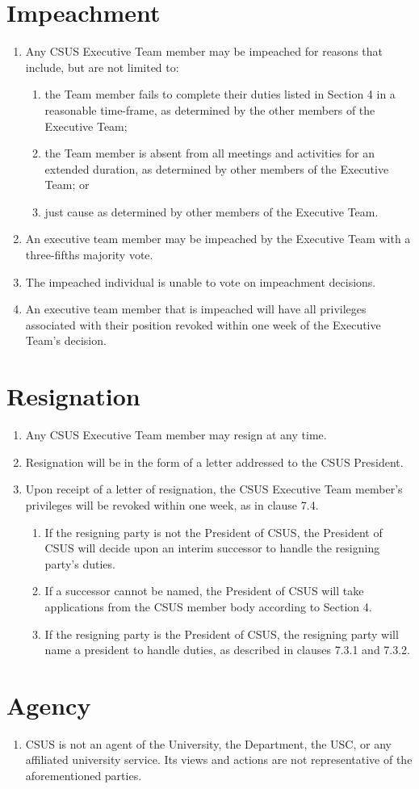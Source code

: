 \documentclass{article}
\begin{document}
\section{Impeachment}
\begin{enumerate}
	\item Any CSUS Executive Team member may be impeached for reasons that include, but are not limited to:
	\begin{enumerate}
		\item the Team member fails to complete their duties listed in Section 4 in a reasonable time-frame, as determined by the other members of the Executive Team;
		\item the Team member is absent from all meetings and activities for an extended duration, as determined by other members of the Executive Team; or
		\item just cause as determined by other members of the Executive Team.
	\end{enumerate}
	\item An executive team member may be impeached by the Executive Team with a three-fifths majority vote.
	\item The impeached individual is unable to vote on impeachment decisions.
	\item An executive team member that is impeached will have all privileges associated with their position revoked within one week of the Executive Team's decision.
\end{enumerate}

\section{Resignation}
\begin{enumerate}
	\item Any CSUS Executive Team member may resign at any time.
	\item Resignation will be in the form of a letter addressed to the CSUS President.
	\item Upon receipt of a letter of resignation, the CSUS Executive Team member's privileges will be revoked within one week, as in clause 7.4.
	\begin{enumerate}
		\item If the resigning party is not the President of CSUS, the President of CSUS will decide upon an interim successor to handle the resigning party's duties.
		\item If a successor cannot be named, the President of CSUS will take applications from the CSUS member body according to Section 4.
		\item If the resigning party is the President of CSUS, the resigning party will name a president to handle duties, as described in clauses 7.3.1 and 7.3.2.
	\end{enumerate}
\end{enumerate}

\section{Agency}
\begin{enumerate}
	\item CSUS is not an agent of the University, the Department, the USC, or any affiliated university service. Its views and actions are not representative of the aforementioned parties.
\end{enumerate}
\end{document}
